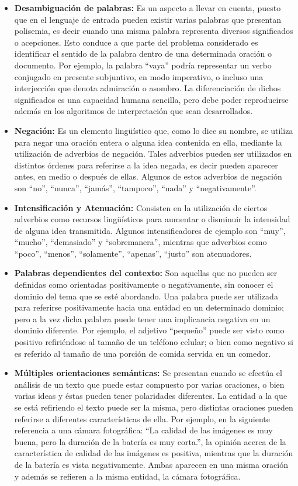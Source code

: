 \begin{itemize}

\item \textbf{Desambiguaci\'on de palabras:} Es un aspecto a llevar en cuenta, puesto que en el lenguaje de entrada pueden existir varias palabras que presentan polisemia, es decir cuando una  misma palabra representa diversos significados o acepciones. Esto conduce a que parte del problema considerado es identificar 	el sentido de la palabra dentro de una determinada oraci\'on o documento. Por ejemplo, la palabra ``vaya'' podr\'ia representar un verbo conjugado en presente subjuntivo, en modo imperativo, o incluso una interjecci\'on que denota admiraci\'on o asombro. La diferenciaci\'on de dichos significados es una capacidad humana sencilla, pero debe poder reproducirse adem\'as en los algoritmos de interpretaci\'on que sean desarrollados.
\item \textbf{Negaci\'on:} Es un elemento ling\"u\'istico que, como lo dice su nombre, se utiliza para negar una oraci\'on entera o alguna idea contenida en ella, mediante la utilizaci\'on de adverbios de negaci\'on. Tales adverbios pueden ser utilizados en distintos \'ordenes para referirse a la idea negada, es decir pueden aparecer antes, en medio o despu\'es de ellas. Algunos de estos adverbios de negaci\'on son ``no'', ``nunca'', ``jam\'as'', ``tampoco'', ``nada'' y ``negativamente''.
\item \textbf{Intensificaci\'on y Atenuaci\'on:} Consisten en la utilizaci\'on de ciertos adverbios como recursos ling\"u\'isticos para aumentar o disminuir la intensidad de alguna idea transmitida.  Algunos intensificadores de ejemplo son ``muy'', ``mucho'', ``demasiado'' y ``sobremanera'',  mientras que adverbios como ``poco'', ``menos'', ``solamente'', ``apenas'', ``justo'' son atenuadores.
\item \textbf{Palabras dependientes del contexto:} Son aquellas que no pueden ser definidas como orientadas positivamente o negativamente, sin conocer el dominio del tema que se est\'e abordando. Una palabra puede ser utilizada para referirse positivamente hacia una entidad en un determinado dominio; pero a la vez dicha palabra puede tener una implicancia negativa en un dominio diferente.
Por ejemplo, el adjetivo ``peque\~no'' puede ser visto como positivo refiri\'endose al tama\~no de un tel\'efono celular; o bien como negativo si es referido al tama\~no de una porci\'on de comida servida en un comedor.
\item \textbf{M\'ultiples orientaciones sem\'anticas:} Se presentan cuando se efect\'ua el an\'alisis de un texto que puede estar compuesto por varias oraciones, o bien varias ideas y \'estas pueden tener polaridades diferentes. La entidad a la que se est\'a refiriendo el texto puede ser la misma, pero distintas oraciones pueden referirse a diferentes caracter\'isticas de ella.  Por ejemplo, en la siguiente referencia a una c\'amara fotogr\'afica: ``La calidad de las im\'agenes es muy buena, pero la duraci\'on de la bater\'ia es muy corta.'', la opini\'on acerca de la caracter\'istica de calidad de las im\'agenes es positiva, mientras que la duraci\'on de la bater\'ia es vista negativamente. Ambas aparecen en una misma oraci\'on y adem\'as se refieren a la misma entidad, la c\'amara fotogr\'afica.

\end{itemize}
